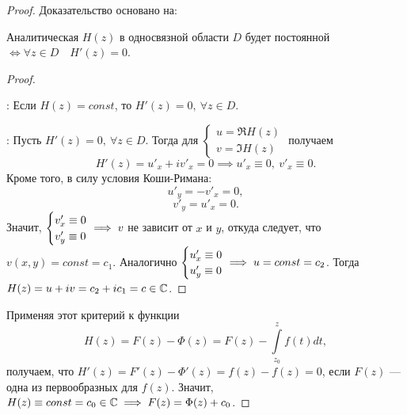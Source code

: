 \documentclass[../../main.tex]{subfiles}
\begin{document}
\begin{proof}
Доказательство основано на:
\begin{thm}
	Аналитическая $H(z)$ в односвязной области $D$ будет постоянной
	$\iff \forall z \in D \quad H'(z) = 0$.
\end{thm}
\begin{proof} ~

\nec:
Если $H(z) = const$, то $H'(z) = 0, \ \forall z \in D$.

\suff:
Пусть $H'(z) = 0, \ \forall z \in D$. Тогда для $\begin{cases}
	u = \Re H(z) \\
	v = \Im H(z)
\end{cases}$ \hspace{-1em} получаем \[H'(z) = u'_x + i v'_x = 0 \implies
u'_x \equiv 0, \ v'_x \equiv 0.\] Кроме того, в силу условия Коши-Римана:
\[ u'_y = -v'_x = 0, \]
\[ v'_y = u'_x = 0.\]
Значит, $\begin{cases} v'_x \equiv 0 \\ v'_y \equiv 0
\end{cases} \hspace{-1em} \implies v $ не зависит от $x$ и $y$, откуда следует, что $ v(x, y) = const = c_1 $.
Аналогично $\begin{cases} u'_x \equiv 0 \\ u'_y \equiv 0
\end{cases} \hspace{-1em} \implies u = const = c_2 $.
Тогда $H(z) = u + i v = c_2 + i c_1 = c \in \mathbb{C} $.
\end{proof}

Применяя этот критерий к функции \[ H(z) = F(z) - \Phi(z) = F(z) -
\int\limits_{z_0}^z f(t) dt,\] получаем, что $ H'(z) = F'(z) - \Phi ' (z) =
f(z) - f(z) = 0$, если $F(z)$ --- одна из первообразных для $f(z)$.
Значит, $H(z) \equiv const = c_0 \in \mathbb{C} \implies F(z) = \Phi(z) + c_0$.
\end{proof}
\end{document}
